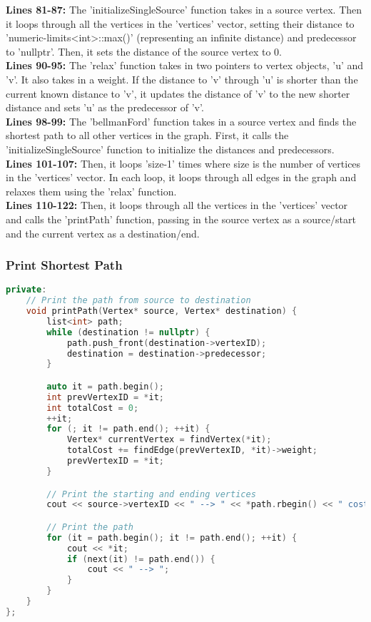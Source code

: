 \documentclass[letterpaper, 10pt,DIV=13]{scrartcl}
\numberwithin{equation}{section} %
\numberwithin{figure}{section} %
\numberwithin{table}{section} %
\begin{document}
\textbf{Lines 81-87:} The 'initializeSingleSource' function takes in a source vertex. Then it loops through all the vertices in the 'vertices' vector, setting their distance to 'numeric-limits<int>::max()' (representing an infinite distance) and predecessor to 'nullptr'. Then, it sets the distance of the source vertex to 0. \\
\textbf{Lines 90-95:} The 'relax' function takes in two pointers to vertex objects, 'u' and 'v'. It also takes in a weight. If the distance to 'v' through 'u' is shorter than the current known distance to 'v', it updates the distance of 'v' to the new shorter distance and sets 'u' as the predecessor of 'v'.\\
\textbf{Lines 98-99:} The 'bellmanFord' function takes in a source vertex and finds the shortest path to all other vertices in the graph. First, it calls the 'initializeSingleSource' function to initialize the distances and predecessors. \\
\textbf{Lines 101-107:} Then, it loops 'size-1' times where size is the number of vertices in the 'vertices' vector. In each loop, it loops through all edges in the graph and relaxes them using the 'relax' function. \\
\textbf{Lines 110-122:} Then, it loops through all the vertices in the 'vertices' vector and calls the 'printPath' function, passing in the source vertex as a source/start and the current vertex as a destination/end.


\subsubsection{Print Shortest Path}
\begin{linenumbers}
\begin{lstlisting}[language=C++, caption={Print Shortest Path}, label={code:example}]
private:
    // Print the path from source to destination
    void printPath(Vertex* source, Vertex* destination) {
        list<int> path;
        while (destination != nullptr) {
            path.push_front(destination->vertexID);
            destination = destination->predecessor;
        }

        auto it = path.begin();
        int prevVertexID = *it;
        int totalCost = 0;
        ++it;
        for (; it != path.end(); ++it) {
            Vertex* currentVertex = findVertex(*it);
            totalCost += findEdge(prevVertexID, *it)->weight;
            prevVertexID = *it;
        }

        // Print the starting and ending vertices
        cout << source->vertexID << " --> " << *path.rbegin() << " cost is " << totalCost << "; path: ";

        // Print the path
        for (it = path.begin(); it != path.end(); ++it) {
            cout << *it;
            if (next(it) != path.end()) {
                cout << " --> ";
            }
        }
    }
};
\end{lstlisting}
\end{linenumbers}
\nolinenumbers
\end{document}
